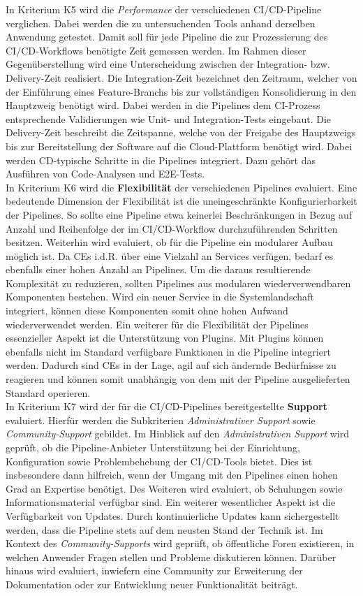 In Kriterium K5 wird die \textit{Performance} der verschiedenen CI/CD-Pipeline verglichen. Dabei werden die zu untersuchenden Tools anhand derselben Anwendung getestet. Damit soll für jede Pipeline die zur Prozessierung des CI/CD-Workflows benötigte Zeit gemessen werden. Im Rahmen dieser Gegenüberstellung wird eine Unterscheidung zwischen der Integration- bzw. Delivery-Zeit realisiert. Die Integration-Zeit bezeichnet den Zeitraum, welcher von der Einführung eines Feature-Branchs bis zur vollständigen Konsolidierung in den Hauptzweig benötigt wird. Dabei werden in die Pipelines dem CI-Prozess entsprechende Validierungen wie Unit- und Integration-Tests eingebaut. Die Delivery-Zeit beschreibt die Zeitspanne, welche von der Freigabe des Hauptzweigs bis zur Bereitstellung der Software auf die Cloud-Plattform benötigt wird. Dabei werden CD-typische Schritte in die Pipelines integriert. Dazu gehört das Ausführen von Code-Analysen und E2E-Tests.\\
In Kriterium K6 wird die \textbf{Flexibilität} der verschiedenen Pipelines evaluiert. Eine bedeutende Dimension der Flexibilität ist die uneingeschränkte Konfigurierbarkeit der Pipelines. So sollte eine Pipeline etwa keinerlei Beschränkungen in Bezug auf Anzahl und Reihenfolge der im CI/CD-Workflow durchzuführenden Schritten besitzen. Weiterhin wird evaluiert, ob für die Pipeline ein modularer Aufbau möglich ist. Da CEs i.d.R. über eine Vielzahl an Services verfügen, bedarf es ebenfalls einer hohen Anzahl an Pipelines. Um die daraus resultierende Komplexität zu reduzieren, sollten Pipelines aus modularen wiederverwendbaren Komponenten bestehen. Wird ein neuer Service in die Systemlandschaft integriert, können diese Komponenten somit ohne hohen Aufwand wiederverwendet werden. Ein weiterer für die Flexibilität der Pipelines essenzieller Aspekt ist die Unterstützung von Plugins. Mit Plugins können ebenfalls nicht im Standard verfügbare Funktionen in die Pipeline integriert werden. Dadurch sind CEs in der Lage, agil auf sich ändernde Bedürfnisse zu reagieren  und können somit unabhängig von dem mit der Pipeline ausgelieferten Standard operieren.\\  
In Kriterium K7 wird der für die CI/CD-Pipelines bereitgestellte \textbf{Support} evaluiert. Hierfür werden die Subkriterien \textit{Administrativer Support} sowie \textit{Community-Support} gebildet. Im Hinblick auf den \textit{Administrativen Support} wird geprüft, ob die Pipeline-Anbieter Unterstützung bei der Einrichtung, Konfiguration sowie Problembehebung der CI/CD-Tools bietet. Dies ist insbesondere dann hilfreich, wenn der Umgang mit den Pipelines einen hohen Grad an Expertise benötigt. Des Weiteren wird evaluiert, ob Schulungen sowie Informationsmaterial verfügbar sind. Ein weiterer wesentlicher Aspekt ist die Verfügbarkeit von Updates. Durch kontinuierliche Updates kann sichergestellt werden, dass die Pipeline stets auf dem neusten Stand der Technik ist. Im Kontext des \textit{Community-Supports} wird geprüft, ob öffentliche Foren existieren, in welchen Anwender Fragen stellen und Probleme diskutieren können. Darüber hinaus wird evaluiert, inwiefern eine Community zur Erweiterung der Dokumentation oder zur Entwicklung neuer Funktionalität beiträgt.\\
